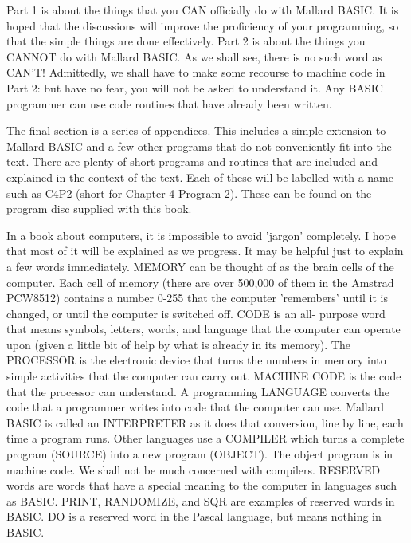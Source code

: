 Part  1 is about the things that you CAN officially do with Mallard BASIC.  It 
is   hoped  that  the  discussions  will  improve  the  proficiency  of   your 
programming,  so that the simple things are done effectively. Part 2 is  about 
the things you CANNOT do with Mallard BASIC. As we shall see, there is no such 
word as CAN'T! Admittedly, we shall have to make some recourse to machine code 
in Part 2: but have no fear, you will not be asked to understand it. Any BASIC 
programmer can use code routines that have already been written.

The final section is a series of appendices. This includes a simple  extension 
to  Mallard BASIC and a few other programs that do not conveniently  fit  into 
the  text. There are plenty of short programs and routines that  are  included 
and explained in the context of the text. Each of these will be labelled  with 
a name such as C4P2 (short for Chapter 4 Program 2). These can be found on the 
program disc supplied with this book.

In  a book about computers, it is impossible to avoid 'jargon'  completely.  I 
hope that most of it will be explained as we progress. It may be helpful  just 
to  explain  a few words immediately. MEMORY can be thought of  as  the  brain 
cells of the computer. Each cell of memory (there are over 500,000 of them  in 
the  Amstrad  PCW8512) contains a number 0-255 that the  computer  'remembers' 
until  it is changed, or until the computer is switched off. CODE is  an  all-
purpose  word  that  means  symbols, letters, words,  and  language  that  the 
computer  can operate upon (given a little bit of help by what is  already  in 
its memory). The PROCESSOR is the electronic device that turns the numbers  in 
memory into simple activities that the computer can carry out. MACHINE CODE is 
the  code that the processor can understand. A programming  LANGUAGE  converts 
the code that a programmer writes into code that the computer can use. Mallard 
BASIC is called an INTERPRETER as it does that conversion, line by line,  each 
time  a  program runs. Other languages use a COMPILER which turns  a  complete 
program (SOURCE) into a new program (OBJECT). The object program is in machine 
code. We shall not be much concerned with compilers. RESERVED words are  words 
that have a special meaning to the computer in languages such as BASIC. PRINT, 
RANDOMIZE,  and SQR are examples of reserved words in BASIC. DO is a  reserved 
word in the Pascal language, but means nothing in BASIC.

